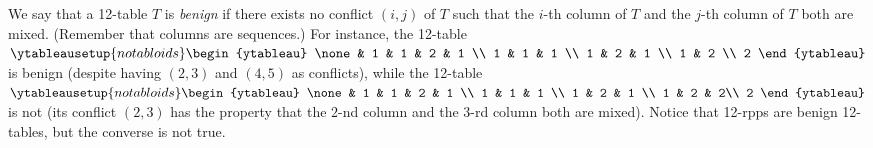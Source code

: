\documentclass[numbers=enddot,12pt,final,onecolumn,notitlepage]{scrartcl}%
\theoremstyle{definition}
\begin{document}
We say that a 12-table $T$ is \textit{benign} if there exists no conflict
$\left(  i,j\right)  $ of $T$ such that the $i$-th column of $T$ and the
$j$-th column of $T$ both are mixed. (Remember that columns are sequences.)
For instance, the 12-table $%
\ytableausetup{notabloids}
\begin{ytableau}
\none& 1 & 1 & 2 & 1 \\
1 & 1 & 1 \\
1 & 2 & 1 \\
1 & 2 \\
2
\end{ytableau}%
$ is benign (despite having $\left(  2,3\right)  $ and $\left(  4,5\right)  $
as conflicts), while the 12-table $%
\ytableausetup{notabloids}
\begin{ytableau}
\none& 1 & 1 & 2 & 1 \\
1 & 1 & 1 \\
1 & 2 & 1 \\
1 & 2 & 2\\
2
\end{ytableau}%
$ is not (its conflict $\left(  2,3\right)  $ has the property that the $2$-nd
column and the $3$-rd column both are mixed). Notice that 12-rpps are benign
12-tables, but the converse is not true.
\end{document}
